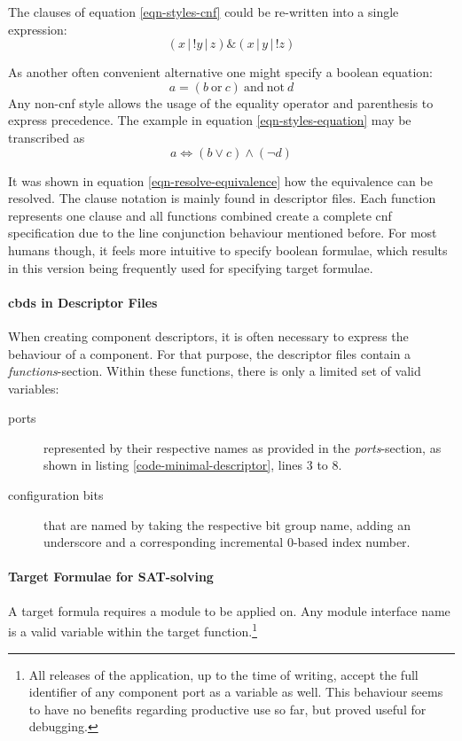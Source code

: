 		The clauses of equation \ref{eqn-styles-cnf} could be re-written into a single expression:
		\begin{equation}
			(x\,|\,!y\,|\,z) \& (x\,|\,y\,|\,!z)
		\end{equation}
		
		As another often convenient alternative one might specify a boolean equation:
		\begin{equation}
			a = (b\ \text{or}\ c)\ \text{and}\ \text{not}\ d
		\label{eqn-styles-equation}
		\end{equation}
		Any non-\gls{cnf} style allows the usage of the equality operator and parenthesis to express precedence.
		The example in equation \ref{eqn-styles-equation} may be transcribed as
		\begin{equation}
			a \Leftrightarrow \left( b \vee c \right) \wedge \left(\neg d \right)
		\end{equation}
		
		It was shown in equation \ref{eqn-resolve-equivalence} how the equivalence can be resolved.
		The clause notation is mainly found in descriptor files.
		Each function represents one clause and all functions combined create a complete \gls{cnf} specification due to the line conjunction behaviour mentioned before.
		For most humans though, it feels more intuitive to specify boolean formulae, which results in this version being frequently used for specifying target formulae.
		
	
	\paragraph{\Glspl{cbd} in Descriptor Files}
		When creating component descriptors, it is often necessary to express the behaviour of a component.
		For that purpose, the descriptor files contain a \emph{functions}-section. 
		Within these functions, there is only a limited set of valid variables:
		\begin{description}
			\item[ports] represented by their respective names as provided in the \emph{ports}-section, as shown in listing \ref{code-minimal-descriptor}, lines 3 to 8.
			\item[configuration bits] that are named by taking the respective bit group name, adding an underscore and a corresponding incremental 0-based index number.
		\end{description}
		
	\paragraph{Target Formulae for SAT-solving}
		A target formula requires a module to be applied on.
		Any module interface name is a valid variable within the target function.\footnote{
			All releases of the application, up to the time of writing, accept	the full identifier of any component port as a variable as well.
			This behaviour seems to have no benefits regarding productive use so far, but proved useful for debugging. 
		}